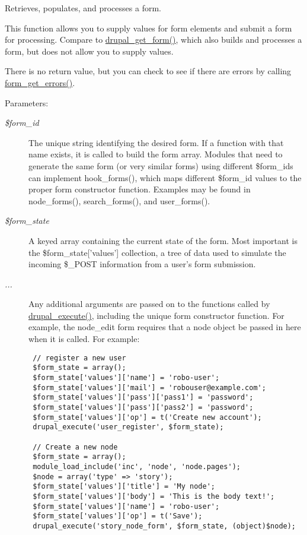 Retrieves, populates, and processes a form.

This function allows you to supply values for form elements and submit a form for processing. Compare to \hyperlink{group__form__api_g720df81a837b06dfe19daf1c1eea3437}{drupal\_\-get\_\-form()}, which also builds and processes a form, but does not allow you to supply values.

There is no return value, but you can check to see if there are errors by calling \hyperlink{group__form__api_g158b3db5e88e96bf060c524cebcb8130}{form\_\-get\_\-errors()}.

\begin{Desc}
\item[Parameters:]
\begin{description}
\item[{\em \$form\_\-id}]The unique string identifying the desired form. If a function with that name exists, it is called to build the form array. Modules that need to generate the same form (or very similar forms) using different \$form\_\-ids can implement hook\_\-forms(), which maps different \$form\_\-id values to the proper form constructor function. Examples may be found in node\_\-forms(), search\_\-forms(), and user\_\-forms(). \item[{\em \$form\_\-state}]A keyed array containing the current state of the form. Most important is the \$form\_\-state\mbox{[}'values'\mbox{]} collection, a tree of data used to simulate the incoming \$\_\-POST information from a user's form submission. \item[{\em ...}]Any additional arguments are passed on to the functions called by \hyperlink{group__form__api_g06dfc84042a094ae6b40bc1840ccced8}{drupal\_\-execute()}, including the unique form constructor function. For example, the node\_\-edit form requires that a node object be passed in here when it is called. For example: 

\begin{Code}\begin{verbatim} // register a new user
 $form_state = array();
 $form_state['values']['name'] = 'robo-user';
 $form_state['values']['mail'] = 'robouser@example.com';
 $form_state['values']['pass']['pass1'] = 'password';
 $form_state['values']['pass']['pass2'] = 'password';
 $form_state['values']['op'] = t('Create new account');
 drupal_execute('user_register', $form_state);

 // Create a new node
 $form_state = array();
 module_load_include('inc', 'node', 'node.pages');
 $node = array('type' => 'story');
 $form_state['values']['title'] = 'My node';
 $form_state['values']['body'] = 'This is the body text!';
 $form_state['values']['name'] = 'robo-user';
 $form_state['values']['op'] = t('Save');
 drupal_execute('story_node_form', $form_state, (object)$node);
\end{verbatim}
\end{Code}

 \end{description}
\end{Desc}
